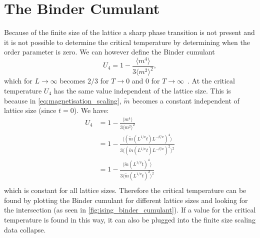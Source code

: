 \documentclass[11pt, a4paper]{report} %
\begin{document}
\section{The Binder Cumulant}
Because of the finite size of the lattice a sharp phase transition is not present and it is not possible to determine the critical temperature by determining when the order parameter is zero.
We can however define the Binder cumulant~\cite{binder:1981b}
\begin{equation}
	U_4 = 1 - \frac{\langle m^4 \rangle}{3 \langle m^2 \rangle^2},
\end{equation}
which for \(L \to \infty\) becomes \(2/3\) for \(T \to 0\) and 0 for \(T \to \infty\)~\cite{landau:2015}.
At the critical temperature \(U_4\) has the same value independent of the lattice size.
This is because in \cref{eq:magnetisation_scaling}, \(\widetilde{m}\) becomes a constant independent of lattice size (since \(t=0\)).
We have:~\cite{corboz}
\begin{align}
	U_4 &= 1 - \frac{\langle m^4 \rangle}{3 \langle m^2 \rangle^2}\\
	&=1 - \frac{\langle \left(\widetilde{m}(L^{1/\nu}t) L^{-\beta/\nu}\right)^4 \rangle}{3 \langle \left(\widetilde{m}(L^{1/\nu}t) L^{-\beta/\nu}\right)^2 \rangle^2} \\
	&= 1 - \frac{\langle \widetilde{m}(L^{1/\nu}t) ^4 \rangle}{3 \langle \widetilde{m}(L^{1/\nu}t)^2 \rangle^2} \\
\end{align}
which is constant for all lattice sizes.
Therefore the critical temperature can be found by plotting the Binder cumulant for different lattice sizes and looking for the intersection (as seen in \cref{fig:ising_binder_cumulant}).
If a value for the critical temperature is found in this way, it can also be plugged into the finite size scaling data collapse.
\end{document}
